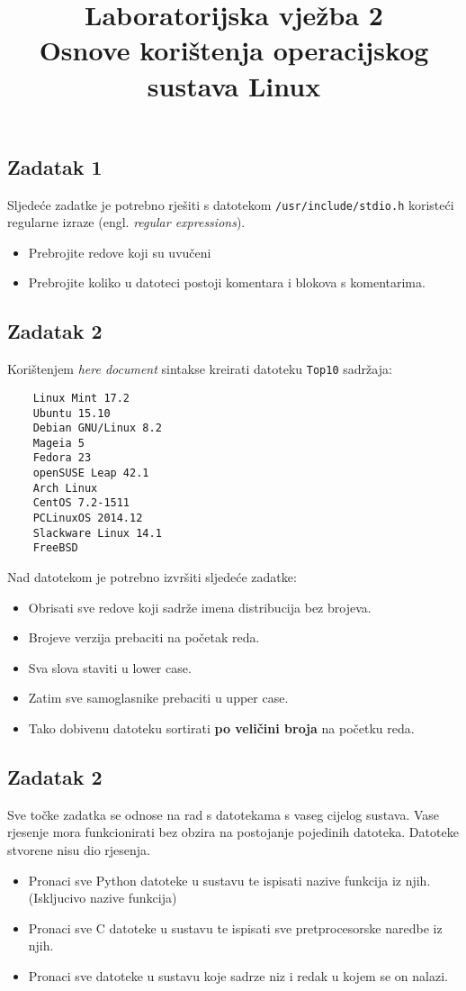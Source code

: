 \documentclass[12pt,a4paper]{article}
\newcommand{\shell}[1]{\texttt{#1}}
\begin{document}
	\title{Laboratorijska vježba 2\\{\small Osnove korištenja operacijskog sustava Linux}\vspace{-2em}}
	\maketitle
	\subsection*{Zadatak 1}
	Sljedeće zadatke je potrebno rješiti s datotekom \shell{/usr/include/stdio.h} koristeći regularne izraze (engl. \emph{regular expressions}).
	\begin{itemize}
		\item Prebrojite redove koji su uvučeni
		\item Prebrojite koliko u datoteci postoji komentara i blokova s komentarima.
	\end{itemize}
	\subsection*{Zadatak 2}
	Korištenjem \emph{here document} sintakse kreirati datoteku \shell{Top10} sadržaja:
	\begin{verbatim}
	Linux Mint 17.2
	Ubuntu 15.10
	Debian GNU/Linux 8.2
	Mageia 5
	Fedora 23
	openSUSE Leap 42.1
	Arch Linux
	CentOS 7.2-1511
	PCLinuxOS 2014.12
	Slackware Linux 14.1
	FreeBSD
	\end{verbatim}
	Nad datotekom je potrebno izvršiti sljedeće zadatke:
	\begin{itemize}
		\item Obrisati sve redove koji sadrže imena distribucija bez brojeva.
		\item Brojeve verzija prebaciti na početak reda.
		\item Sva slova staviti u lower case.
		\item Zatim sve samoglasnike prebaciti u upper case.
		\item Tako dobivenu datoteku sortirati \textbf{po veličini broja} na početku reda.
	\end{itemize}
  
	\subsection*{Zadatak 2}
	Sve točke zadatka se odnose na rad s datotekama s vaseg cijelog sustava. Vase rjesenje mora funkcionirati bez obzira na postojanje pojedinih datoteka. Datoteke stvorene nisu dio rjesenja.
	\begin{itemize}
    \item Pronaci sve Python datoteke u sustavu te ispisati nazive funkcija iz njih. (Iskljucivo nazive funkcija)
		\item Pronaci sve C datoteke u sustavu te ispisati sve pretprocesorske naredbe iz njih.
    \item Pronaci sve datoteke u sustavu koje sadrze niz  i redak u kojem se on nalazi.
	\end{itemize}
\end{document}
